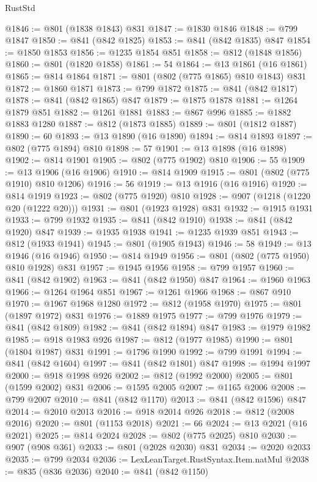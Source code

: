 \begin{lexlean}{RustStd}
\begin{coremodule}
{\begin{coremodule}
{{{{{@1846 := @801 (@1838 @1843) @831
@1847 := @1830 @1846
@1848 := @799 @1847
@1850 := @841 (@842 @1825)
@1853 := @841 (@842 @1835) @847
@1854 := @1850 @1853
@1856 := @1235 @1854 @851
@1858 := @812 (@1848 @1856)
@1860 := @801 (@1820 @1858)
@1861 := 54
@1864 := @13 @1861 (@16 @1861)
@1865 := @814 @1864
@1871 := @801 (@802 (@775 @1865) @810 @1843) @831
@1872 := @1860 @1871
@1873 := @799 @1872
@1875 := @841 (@842 @1817)
@1878 := @841 (@842 @1865) @847
@1879 := @1875 @1878
@1881 := @1264 @1879 @851
@1882 := @1261 @1881
@1883 := @867 @996
@1885 := @1882 @1883 @1280
@1887 := @812 (@1873 @1885)
@1889 := @801 (@1812 @1887)
@1890 := 60
@1893 := @13 @1890 (@16 @1890)
@1894 := @814 @1893
@1897 := @802 (@775 @1894) @810
@1898 := 57
@1901 := @13 @1898 (@16 @1898)
@1902 := @814 @1901
@1905 := @802 (@775 @1902) @810
@1906 := 55
@1909 := @13 @1906 (@16 @1906)
@1910 := @814 @1909
@1915 := @801 (@802 (@775 @1910) @810 @1206)
@1916 := 56
@1919 := @13 @1916 (@16 @1916)
@1920 := @814 @1919
@1923 := @802 (@775 @1920) @810
@1928 := @907 (@1218 (@1220 @20 (@1222 @20)))
@1931 := @801 (@1923 @1928) @831
@1932 := @1915 @1931
@1933 := @799 @1932
@1935 := @841 (@842 @1910)
@1938 := @841 (@842 @1920) @847
@1939 := @1935 @1938
@1941 := @1235 @1939 @851
@1943 := @812 (@1933 @1941)
@1945 := @801 (@1905 @1943)
@1946 := 58
@1949 := @13 @1946 (@16 @1946)
@1950 := @814 @1949
@1956 := @801 (@802 (@775 @1950) @810 @1928) @831
@1957 := @1945 @1956
@1958 := @799 @1957
@1960 := @841 (@842 @1902)
@1963 := @841 (@842 @1950) @847
@1964 := @1960 @1963
@1966 := @1264 @1964 @851
@1967 := @1261 @1966
@1968 := @867 @910
@1970 := @1967 @1968 @1280
@1972 := @812 (@1958 @1970)
@1975 := @801 (@1897 @1972) @831
@1976 := @1889 @1975
@1977 := @799 @1976
@1979 := @841 (@842 @1809)
@1982 := @841 (@842 @1894) @847
@1983 := @1979 @1982
@1985 := @918 @1983 @926
@1987 := @812 (@1977 @1985)
@1990 := @801 (@1804 @1987) @831
@1991 := @1796 @1990
@1992 := @799 @1991
@1994 := @841 (@842 @1604)
@1997 := @841 (@842 @1801) @847
@1998 := @1994 @1997
@2000 := @918 @1998 @926
@2002 := @812 (@1992 @2000)
@2005 := @801 (@1599 @2002) @831
@2006 := @1595 @2005
@2007 := @1165 @2006
@2008 := @799 @2007
@2010 := @841 (@842 @1170)
@2013 := @841 (@842 @1596) @847
@2014 := @2010 @2013
@2016 := @918 @2014 @926
@2018 := @812 (@2008 @2016)
@2020 := @801 (@1153 @2018)
@2021 := 66
@2024 := @13 @2021 (@16 @2021)
@2025 := @814 @2024
@2028 := @802 (@775 @2025) @810
@2030 := @907 (@908 @361)
@2033 := @801 (@2028 @2030) @831
@2034 := @2020 @2033
@2035 := @799 @2034
@2036 := LexLeanTarget.RustSyntax.Item.natMul
@2038 := @835 (@836 @2036)
@2040 := @841 (@842 @1150)
}}}}}
\end{coremodule}}
\end{coremodule}
\end{lexlean}
